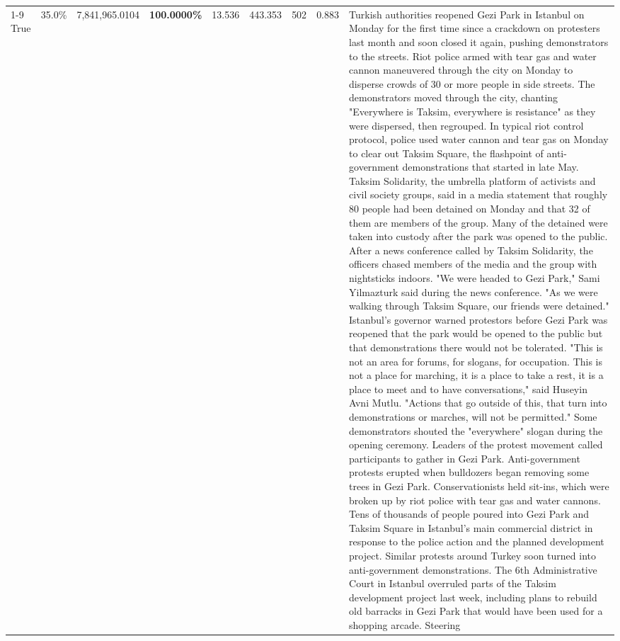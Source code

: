 \begin{table}[H]
\begin{tabular}{lllrlllll}
\cline{1-9}
True & 35.0\% & 7,841,965.0104 & \bfseries \color{red} 100.0000\% & 13.536 & 443.353 & 502 & 0.883 & Turkish authorities reopened Gezi Park in Istanbul on Monday for the first time since a crackdown on protesters last month and soon closed it again, pushing demonstrators to the streets. Riot police armed with tear gas and water cannon maneuvered through the city on Monday to disperse crowds of 30 or more people in side streets. The demonstrators moved through the city, chanting "Everywhere is Taksim, everywhere is resistance" as they were dispersed, then regrouped. In typical riot control protocol, police used water cannon and tear gas on Monday to clear out Taksim Square, the flashpoint of anti-government demonstrations that started in late May. Taksim Solidarity, the umbrella platform of activists and civil society groups, said in a media statement that roughly 80 people had been detained on Monday and that 32 of them are members of the group. Many of the detained were taken into custody after the park was opened to the public. After a news conference called by Taksim Solidarity, the officers chased members of the media and the group with nightsticks indoors. "We were headed to Gezi Park," Sami Yilmazturk said during the news conference. "As we were walking through Taksim Square, our friends were detained." Istanbul's governor warned protestors before Gezi Park was reopened that the park would be opened to the public but that demonstrations there would not be tolerated. "This is not an area for forums, for slogans, for occupation. This is not a place for marching, it is a place to take a rest, it is a place to meet and to have conversations," said Huseyin Avni Mutlu. "Actions that go outside of this, that turn into demonstrations or marches, will not be permitted." Some demonstrators shouted the "everywhere" slogan during the opening ceremony. Leaders of the protest movement called participants to gather in Gezi Park. Anti-government protests erupted when bulldozers began removing some trees in Gezi Park. Conservationists held sit-ins, which were broken up by riot police with tear gas and water cannons. Tens of thousands of people poured into Gezi Park and Taksim Square in Istanbul's main commercial district in response to the police action and the planned development project. Similar protests around Turkey soon turned into anti-government demonstrations. The 6th Administrative Court in Istanbul overruled parts of the Taksim development project last week, including plans to rebuild old barracks in Gezi Park that would have been used for a shopping arcade. Steering \\

\end{tabular}
\end{table}
